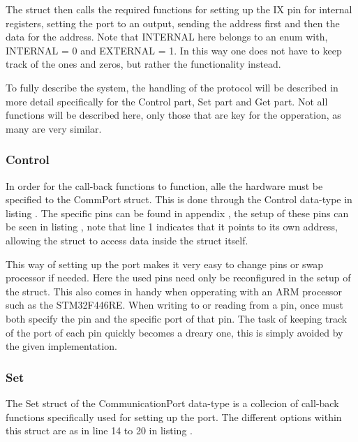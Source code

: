 The struct then calls the required functions for setting up the IX pin for internal registers, setting the port to an output, sending the address first and then the data for the address. Note that INTERNAL here belongs to an enum with, INTERNAL = 0 and EXTERNAL = 1. In this way one does not have to keep track of the ones and zeros, but rather the functionality instead.

To fully describe the system, the handling of the protocol will be described in more detail specifically for the Control part, Set part and Get part. Not all functions will be described here, only those that are key for the opperation, as many are very similar.

\subsubsection{Control}
In order for the call-back functions to function, alle the hardware must be specified to the CommPort struct. This is done through the Control data-type in listing . The specific pins can be found in appendix , the setup of these pins can be seen in listing , note that line 1 indicates that it points to its own address, allowing the struct to access data inside the struct itself.



This way of setting up the port makes it very easy to change pins or swap processor if needed. Here the used pins need only be reconfigured in the setup of the struct. This also comes in handy when opperating with an ARM processor such as the STM32F446RE. When writing to or reading from a pin, once must both specify the pin and the specific port of that pin. The task of keeping track of the port of each pin quickly becomes a dreary one, this is simply avoided by the given implementation.

\subsubsection{Set}
The Set struct of the CommunicationPort data-type is a collecion of call-back functions specifically used for setting up the port. The different options within this struct are as in line 14 to 20 in listing .

